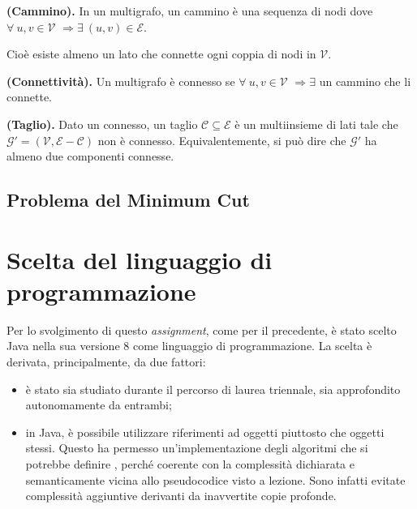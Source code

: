 \begin{defi} \textbf{(Cammino).} In un multigrafo, un cammino è una sequenza di nodi dove $\forall\ u,v\in\mathcal{V}$ $\Rightarrow\exists\ (u,v)\in\mathcal{E} $.
\end{defi}
Cioè esiste almeno un lato che connette ogni coppia di nodi in $\mathcal{V}$.
\begin{defi} \textbf{(Connettività).} Un multigrafo è connesso se $\forall\ u,v\in\mathcal{V}$ $\Rightarrow\exists$ un cammino che li connette.
\end{defi}
\begin{defi} \textbf{(Taglio).} Dato un \mgrafo connesso, un taglio $\mathcal{C}\subseteq\mathcal{E}$ è un multiinsieme di lati tale che $\mathcal{G}' = (\mathcal{V}, \mathcal{E} - \mathcal{C})$ non è connesso.\eqcapo
Equivalentemente, si può dire che $\mathcal{G}'$ ha almeno due componenti connesse.
\end{defi}
\newpage
\subsection{Problema del Minimum Cut}
\emph{}
 
\section{Scelta del linguaggio di programmazione}
Per lo svolgimento di questo \emph{assignment}, come per il precedente, è stato scelto Java nella sua versione 8 come linguaggio di programmazione. La scelta è derivata, principalmente, da due fattori: 
\begin{itemize}
	\item è stato sia studiato durante il percorso di laurea triennale, sia approfondito autonomamente da entrambi;
	\item in Java, è possibile utilizzare riferimenti ad oggetti piuttosto che oggetti stessi. Questo ha permesso un'implementazione degli algoritmi che si potrebbe definire , perché coerente con la complessità dichiarata e semanticamente vicina allo pseudocodice visto a lezione. Sono infatti evitate complessità aggiuntive derivanti da inavvertite copie profonde.
\end{itemize}

